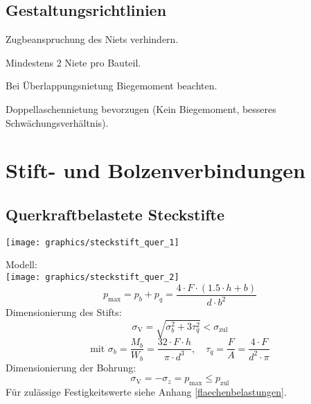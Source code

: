 	\subsection{Gestaltungsrichtlinien} %
		\begin{tightitemize}
			\item Zugbeanspruchung des Niets verhindern.
			\item Mindestens 2 Niete pro Bauteil.
			\item Bei Überlappungsnietung Biegemoment beachten.
			\item Doppellaschennietung bevorzugen (Kein Biegemoment, besseres Schwächungsverhältnis).
		\end{tightitemize}
\section{Stift- und Bolzenverbindungen} %
	\subsection{Querkraftbelastete Steckstifte} %
		\begin{center}
			\texttt{[image: graphics/steckstift\_quer\_1]}
		\end{center}
		Modell: \\
		\texttt{[image: graphics/steckstift\_quer\_2]}
		\begin{equation*}
			p_{\text{max}} = p_b + p_q = \frac{4 \cdot F \cdot (1.5 \cdot h + b)}{d \cdot b^2}
		\end{equation*}
		Dimensionierung des Stifts:
		\begin{equation*}
			\sigma_{\text{V}} = \sqrt{\sigma_b^2 + 3 \tau_q^2} < \sigma_{\text{zul}}
		\end{equation*}
		\begin{equation*}
			\text{mit } \sigma_b = \frac{M_b}{W_b}=\frac{32 \cdot F \cdot h}{\pi \cdot d^3}, \quad \tau_q = \frac{F}{A}= \frac{4 \cdot F}{d^2 \cdot \pi}
		\end{equation*}
		Dimensionierung der Bohrung:
		\begin{equation*}
			\sigma_{\text{V}} = - \sigma_z = p_{\text{max}} \leq p_{\text{zul}}
		\end{equation*}
		Für zulässige Festigkeitswerte siehe Anhang \ref{flaechenbelastungen}.
